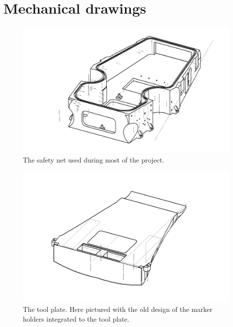 \section{Mechanical drawings}
\label{appendix:mechanical}


\begin{figure}[!ht]
	\begin{center}
		\includegraphics[width=13.2cm]{./Images/Mechanics/ComputerHull1.jpg}
		\caption{The safety net used during most of the project.}
		\label{DemComputerHull}
	\end{center}
\end{figure}


\begin{figure}[!ht]
	\begin{center}
		\includegraphics[width=13.2cm]{./Images/Mechanics/ToolPlate.jpg}
		\caption{The tool plate. Here pictured with the old design of the marker holders integrated to the tool plate.}
		\label{DatRightWing}
	\end{center}
\end{figure} 

